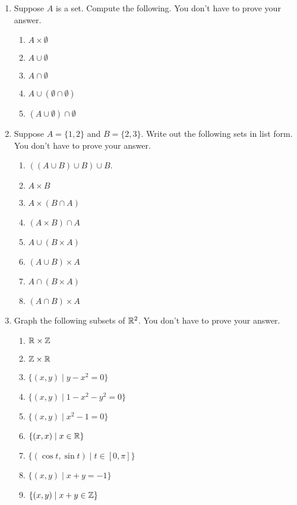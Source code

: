 \probsec{~\ref{sec:prod-union-inters}}
\begin{enumerate}
  \item Suppose $A$ is a set. Compute the following. You don't have to prove your answer.
\begin{enumerate}
    \item $A \times \emptyset$
    \item $A \cup \emptyset$
    \item $A \cap \emptyset$
    \item $A \cup (\emptyset \cap \emptyset)$
    \item $(A \cup \emptyset) \cap \emptyset$
\end{enumerate}

  \item Suppose $A = \{1, 2\}$ and $B = \{2, 3\}$. Write out the following sets in list form. You don't have to prove your answer.
\begin{enumerate}
    \item $((A \cup B) \cup B) \cup B$.
    \item $A \times B$
    \item $A \times (B \cap A)$
    \item $(A \times B) \cap A$
    \item $A \cup (B \times A)$
    \item $(A \cup B) \times A$
    \item $A \cap (B \times A)$
    \item $(A \cap B) \times A$
\end{enumerate}

  \item Graph the following subsets of $\mathbb{R}^2$. You don't have to prove your answer.
\begin{enumerate}
    \item $\mathbb{R} \times \mathbb{Z}$
    \item $\mathbb{Z} \times \mathbb{R}$
    \item $\{(x, y) \mid y - x^2 = 0\}$
    \item $\{(x, y) \mid 1 - x^2 - y^2 = 0\}$
    \item $\{(x, y) \mid x^2 - 1 = 0\}$
    \item $\{(x, x) \mid x \in \mathbb{R}\}$
    \item $\{(\cos t, \sin t) \mid t \in [0, \pi]\}$
    \item $\{(x, y) \mid x + y = -1\}$
    \item $\{(x, y) \mid x + y \in \mathbb{Z}\}$
\end{enumerate}



\end{enumerate}
